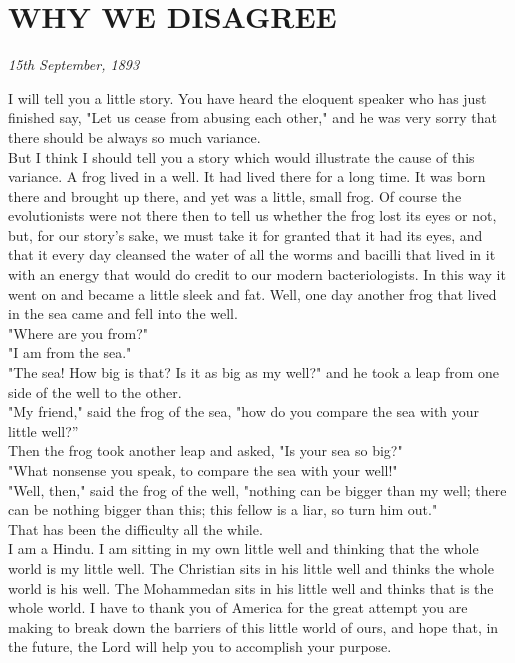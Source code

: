 \section{WHY WE DISAGREE }
\begin{center}\textit{ \textit{15th September, 1893}}\end{center}

I will tell you a little story. You have heard the eloquent
speaker who has just finished say, "Let us cease from abusing each
other," and he was very sorry that there should be always so much
variance. \\

But I think I should tell you a story which would illustrate
the cause of this variance. A frog lived in a
well. It had lived there for a long time. It was born there and brought
up there, and yet was a little, small frog. Of course the evolutionists
were not there then to tell us whether the frog lost its eyes or not,
but, for our story's sake, we must take it for granted that it had its
eyes, and that it every day cleansed the water of all the worms and
bacilli that lived in it with an energy that would do credit to our
modern bacteriologists. In this way it went on and became a little
sleek and fat. Well, one day another frog that lived in the sea came
and fell into the well. \\

"Where are you from?" \\

"I am from the sea." \\

"The sea! How big is that? Is it as big as my well?" and he
took a leap from one side of the well to the other. \\

"My friend," said the frog of the sea, "how do you compare the
sea with your little well?” \\

Then the frog took another leap and asked, "Is your sea so
big?" \\

"What nonsense you speak, to compare the sea with your well!" \\

"Well, then," said the frog of the well, "nothing can be
bigger than my well; there can be nothing bigger than this; this fellow
is a liar, so turn him out." \\

That has been the difficulty all the while. \\

I am a Hindu. I am sitting in my own little well and thinking
that the whole world is my little well. The Christian sits in his
little well and thinks the whole world is his well. The Mohammedan sits
in his little well and thinks that is the whole world. I have to thank
you of America for the great attempt you are making to break down the
barriers of this little world of ours, and hope that, in the future,
the Lord will help you to accomplish your purpose.\\

